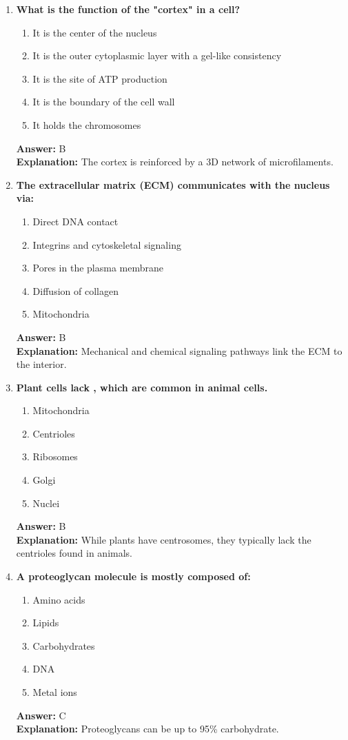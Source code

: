 \documentclass[11pt, a4paper]{article}
\begin{document}
\begin{enumerate}[leftmargin=*, label=\arabic*.]
\item \textbf{What is the function of the "cortex" in a cell?}
\begin{enumerate}[label=\Alph*.]
\item It is the center of the nucleus
\item It is the outer cytoplasmic layer with a gel-like consistency
\item It is the site of ATP production
\item It is the boundary of the cell wall
\item It holds the chromosomes
\end{enumerate}
\textbf{Answer:} B \\
\textbf{Explanation:} The cortex is reinforced by a 3D network of microfilaments.

\item \textbf{The extracellular matrix (ECM) communicates with the nucleus via:}
\begin{enumerate}[label=\Alph*.]
\item Direct DNA contact
\item Integrins and cytoskeletal signaling
\item Pores in the plasma membrane
\item Diffusion of collagen
\item Mitochondria
\end{enumerate}
\textbf{Answer:} B \\
\textbf{Explanation:} Mechanical and chemical signaling pathways link the ECM to the interior.

\item \textbf{Plant cells lack \underline{\hspace{1cm}}, which are common in animal cells.}
\begin{enumerate}[label=\Alph*.]
\item Mitochondria
\item Centrioles
\item Ribosomes
\item Golgi
\item Nuclei
\end{enumerate}
\textbf{Answer:} B \\
\textbf{Explanation:} While plants have centrosomes, they typically lack the centrioles found in animals.

\item \textbf{A proteoglycan molecule is mostly composed of:}
\begin{enumerate}[label=\Alph*.]
\item Amino acids
\item Lipids
\item Carbohydrates
\item DNA
\item Metal ions
\end{enumerate}
\textbf{Answer:} C \\
\textbf{Explanation:} Proteoglycans can be up to 95\% carbohydrate.


\end{enumerate}
\end{document}
